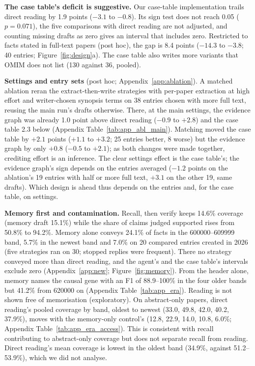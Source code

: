 \documentclass{article} %
\begin{document}
\textbf{The case table's deficit is suggestive.} Our case-table implementation trails direct reading by 1.9 points ($-3.1$ to $-0.8$). Its sign test does not reach 0.05 ($p=0.071$), the five comparisons with direct reading are not adjusted, and counting missing drafts as zero gives an interval that includes zero. Restricted to facts stated in full-text papers (post hoc), the gap is 8.4 points ($-14.3$ to $-3.8$; 40 entries; Figure~\ref{fig:design}a). The case table also writes more variants that OMIM does not list (130 against 36, pooled).

\textbf{Settings and entry sets} (post hoc; Appendix~\ref{app:ablation}). A matched ablation reran the extract-then-write strategies with per-paper extraction at high effort and writer-chosen synopsis terms on 38 entries chosen with more full text, reusing the main run's drafts otherwise. There, at the main settings, the evidence graph was already 1.0 point above direct reading ($-0.9$ to $+2.8$) and the case table 2.3 below (Appendix Table~\ref{tab:app_abl_main}). Matching moved the case table by $+2.1$ points ($+1.1$ to $+3.2$; 25 entries better, 8 worse) but the evidence graph by only $+0.8$ ($-0.5$ to $+2.1$); as both changes were made together, crediting effort is an inference. The clear settings effect is the case table's; the evidence graph's sign depends on the entries averaged ($-1.2$ points on the ablation's 19 entries with half or more full text, $+3.1$ on the other 19, same drafts). Which design is ahead thus depends on the entries and, for the case table, on settings.

\textbf{Memory first and contamination.} Recall, then verify keeps 14.6\% coverage (memory draft 15.1\%) while the share of claims judged supported rises from 50.8\% to 94.2\%. Memory alone conveys 24.1\% of facts in the 600000--609999 band, 5.7\% in the newest band and 7.0\% on 20 compared entries created in 2026 (five strategies ran on 30; stopped replies were frequent). There no strategy conveyed more than direct reading, and the agent's and the case table's intervals exclude zero (Appendix~\ref{app:new}; Figure~\ref{fig:memory}). From the header alone, memory names the causal gene with an F1 of 88.9--100\% in the four older bands but 41.2\% from 620000 on (Appendix Table~\ref{tab:app_era}). Reading is not shown free of memorisation (exploratory). On abstract-only papers, direct reading's pooled coverage by band, oldest to newest (33.0, 49.8, 42.0, 40.2, 37.9\%), moves with the memory-only control's (12.8, 22.9, 14.0, 10.8, 6.0\%; Appendix Table~\ref{tab:app_era_access}). This is consistent with recall contributing to abstract-only coverage but does not separate recall from reading. Direct reading's mean coverage is lowest in the oldest band (34.9\%, against 51.2--53.9\%), which we did not analyse.
\end{document}
